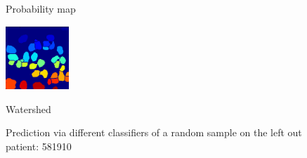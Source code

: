 \documentclass{article}
\begin{document}
\begin{figure}[htb]
\begin{minipage}[b]{.32\linewidth}
  \centerline{Probability map}\medskip
\end{minipage}
\hfill
\begin{minipage}[b]{.32\linewidth}
  \centering
  \centerline{\includegraphics[height=2.4cm]{FCN_WS}}
  \centerline{Watershed}\medskip
\end{minipage}
%
\caption{Prediction via different classifiers of a random sample on the left out patient: 581910}
\label{fig:prediction}
%
\end{figure}

\vfill
\pagebreak


%
%

%





\end{document}
